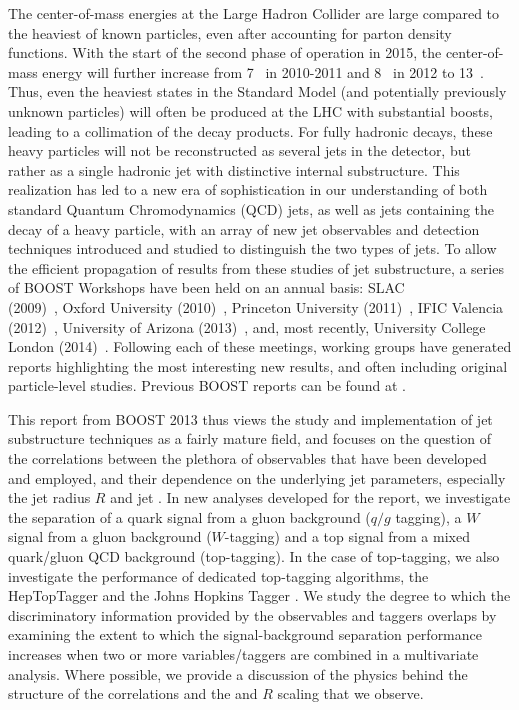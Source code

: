 The center-of-mass energies at the Large Hadron Collider are large compared to the heaviest of known particles, even after accounting for parton density functions. With the start of the second phase of operation in 2015, the center-of-mass energy will further increase from 7~\tev{} in 2010-2011 and 8~\tev{} in 2012 to 13~\tev{}. Thus, even the heaviest states in the Standard Model (and potentially previously unknown particles) will often be produced at the LHC with substantial boosts, leading to a collimation of the decay products.  For fully hadronic decays, these heavy particles will not be reconstructed as several jets in the detector, but rather as a single hadronic jet with distinctive internal substructure.  This realization has led to a new era of sophistication in our understanding of both standard Quantum Chromodynamics (QCD) jets, as well as jets containing the decay of a heavy particle, with an array of new jet observables and detection techniques introduced and studied to distinguish the two types of jets.  To allow the efficient propagation of  results from these studies of jet substructure, a series of BOOST Workshops have been held on an annual basis:
SLAC\\ (2009)~\cite{Boost:2009xx},
Oxford University (2010)~\cite{Boost:2010xx},
Princeton University (2011)~\cite{Boost:2011xx},
IFIC Valencia (2012)~\cite{Boost:2012xx}, 
University of Arizona (2013)~\cite{Boost:2013xx},
and, most recently, University College London (2014)~\cite{Boost:2014xx}.
Following each of these meetings, working groups have generated reports
highlighting the most interesting new results, and often including original particle-level studies. Previous BOOST reports can be found at \cite{Abdesselam:2010pt,Altheimer:2012mn,Altheimer:2013yza}.

This report from BOOST 2013 thus views the study and implementation of jet substructure techniques as a fairly mature field, and focuses on the question of the correlations between the plethora of observables that have been developed and employed, and their dependence on the underlying jet parameters, especially the jet radius $R$ and jet \pt. In new analyses developed for the report, we investigate the separation of a quark signal from a gluon background ($q/g$ tagging), a $W$ signal from a gluon background ($W$-tagging) and a top signal from a mixed quark/gluon QCD background (top-tagging). In the case of top-tagging, we also investigate the performance of dedicated top-tagging algorithms, the HepTopTagger \cite{Plehn:2010st} and the Johns Hopkins Tagger \cite{Kaplan:2008ie}. We study the degree to which the discriminatory information provided by the observables and taggers overlaps by examining the extent to which the signal-background separation performance increases when two or more variables/taggers are combined in a multivariate analysis. Where possible, we provide a discussion of the physics behind the structure of the correlations and the \pt and $R$ scaling that we observe. 



